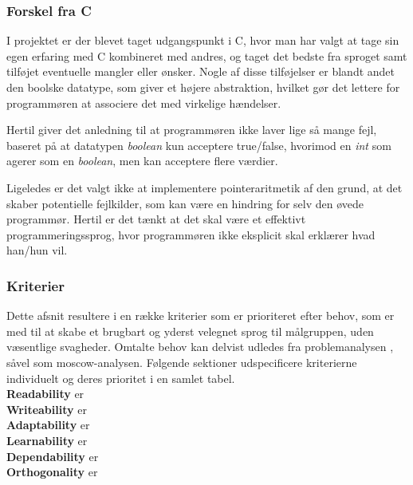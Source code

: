 \subsubsection{Forskel fra C}
\label{sec:forskelfrac}
I projektet er der blevet taget udgangspunkt i C, hvor man har valgt at tage sin egen erfaring med C kombineret med andres, og taget det bedste fra sproget samt tilføjet eventuelle mangler eller ønsker.
Nogle af disse tilføjelser er blandt andet den boolske datatype, som giver et højere abstraktion, hvilket gør det  lettere for programmøren at associere det med virkelige hændelser.

Hertil giver det anledning til at programmøren ikke laver lige så mange fejl, baseret på at datatypen \textit{boolean} kun acceptere true/false, hvorimod en \textit{int} som agerer som en \textit{boolean}, men kan acceptere flere værdier.

Ligeledes er det valgt ikke at implementere pointeraritmetik af den grund, at det skaber potentielle fejlkilder, som kan være en hindring for selv den øvede programmør. Hertil er det tænkt at det skal være et effektivt programmeringssprog, hvor programmøren ikke eksplicit skal erklærer hvad han/hun vil.

\subsubsection{Kriterier}
Dette afsnit resultere i en række kriterier som er prioriteret efter behov, som er med til at skabe et brugbart og yderst velegnet sprog til målgruppen, uden væsentlige svagheder. Omtalte behov kan delvist udledes fra problemanalysen , såvel som \gls{moscow}-analysen.
Følgende sektioner udspecificere kriterierne individuelt og deres prioritet i en samlet tabel.\\

\noindent\textbf{Readability} er\\

\noindent\textbf{Writeability} er\\

\noindent\textbf{Adaptability} er\\

\noindent\textbf{Learnability} er\\

\noindent\textbf{Dependability} er\\

\noindent\textbf{Orthogonality} er\\
